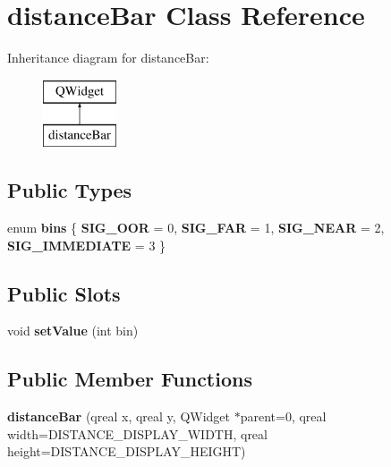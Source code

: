 \hypertarget{classdistance_bar}{\section{distance\+Bar Class Reference}
\label{classdistance_bar}
}
Inheritance diagram for distance\+Bar\+:\begin{figure}[H]
\begin{center}
\leavevmode
\includegraphics[height=2.000000cm]{classdistance_bar}
\end{center}
\end{figure}
\subsection*{Public Types}
\begin{DoxyCompactItemize}
\item 
\hypertarget{classdistance_bar_affb5e4f75675ad8818e25e20ad49a7bf}{enum {\bfseries bins} \{ {\bfseries S\+I\+G\+\_\+\+O\+O\+R} = 0, 
{\bfseries S\+I\+G\+\_\+\+F\+A\+R} = 1, 
{\bfseries S\+I\+G\+\_\+\+N\+E\+A\+R} = 2, 
{\bfseries S\+I\+G\+\_\+\+I\+M\+M\+E\+D\+I\+A\+T\+E} = 3
 \}}\label{classdistance_bar_affb5e4f75675ad8818e25e20ad49a7bf}

\end{DoxyCompactItemize}
\subsection*{Public Slots}
\begin{DoxyCompactItemize}
\item 
\hypertarget{classdistance_bar_a232f5295b631a95159790f6ba3fac61c}{void {\bfseries set\+Value} (int bin)}\label{classdistance_bar_a232f5295b631a95159790f6ba3fac61c}

\end{DoxyCompactItemize}
\subsection*{Public Member Functions}
\begin{DoxyCompactItemize}
\item 
\hypertarget{classdistance_bar_ab3c26ace6b9312e0ac8852eae724a852}{{\bfseries distance\+Bar} (qreal x, qreal y, Q\+Widget $\ast$parent=0, qreal width=D\+I\+S\+T\+A\+N\+C\+E\+\_\+\+D\+I\+S\+P\+L\+A\+Y\+\_\+\+W\+I\+D\+T\+H, qreal height=D\+I\+S\+T\+A\+N\+C\+E\+\_\+\+D\+I\+S\+P\+L\+A\+Y\+\_\+\+H\+E\+I\+G\+H\+T)}\label{classdistance_bar_ab3c26ace6b9312e0ac8852eae724a852}

\end{DoxyCompactItemize}
